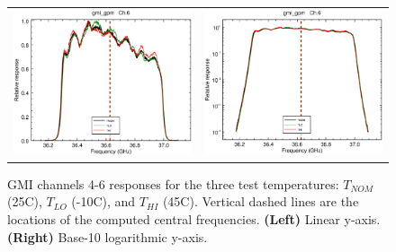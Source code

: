 \begin{figure}[H]
\begin{tabular}{c c}
    \includegraphics[scale=0.35]{graphics/lin/gmi_gpm-6.eps} &
    \includegraphics[scale=0.35]{graphics/log/gmi_gpm-6.eps}
  \end{tabular}
  \caption{GMI channels 4-6 responses for the three test temperatures: $T_{NOM}$ (25\textdegree{}C), $T_{LO}$ (-10\textdegree{}C), and $T_{HI}$ (45\textdegree{}C). Vertical dashed lines are the locations of the computed central frequencies. \textbf{(Left)} Linear y-axis. \textbf{(Right)} Base-10 logarithmic y-axis.}
  \label{fig:ch4-6_response}
\end{figure}

